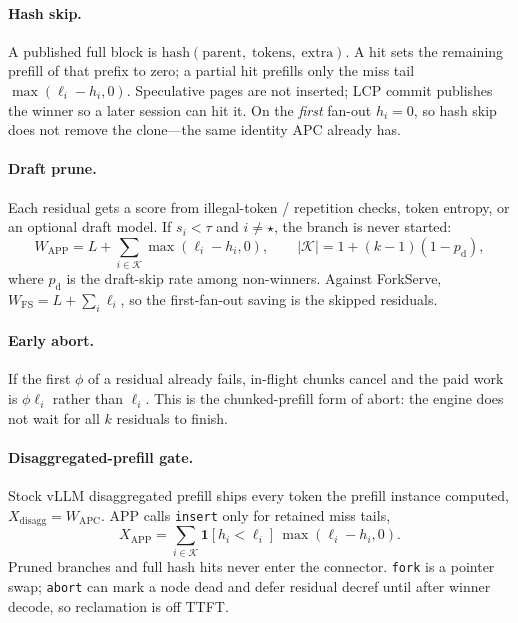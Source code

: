 \documentclass[11pt,a4paper]{article}
\begin{document}
\paragraph{Hash skip.}
A published full block is $\mathrm{hash}(\mathrm{parent},\;\mathrm{tokens},\;\mathrm{extra})$.
A hit sets the remaining prefill of that prefix to zero; a partial hit prefills only the miss tail $\max(\ell_i-h_i,0)$.
Speculative pages are not inserted; LCP commit publishes the winner so a later session can hit it.
On the \emph{first} fan-out $h_i{=}0$, so hash skip does not remove the clone---the same identity APC already has.

\paragraph{Draft prune.}
Each residual gets a score from illegal-token / repetition checks, token entropy, or an optional draft model.
If $s_i<\tau$ and $i\neq\star$, the branch is never started:
\begin{equation}
\label{eq:app-w}
W_{\mathrm{APP}}
  = L + \sum_{i\in\mathcal{K}}\max(\ell_i-h_i,0),
\qquad
|\mathcal{K}|
  = 1+(k{-}1)(1-p_{\mathrm{d}}),
\end{equation}
where $p_{\mathrm{d}}$ is the draft-skip rate among non-winners.
Against ForkServe, $W_{\mathrm{FS}}=L+\sum_i\ell_i$, so the first-fan-out saving is the skipped residuals.

\paragraph{Early abort.}
If the first $\phi$ of a residual already fails, in-flight chunks cancel and the paid work is $\phi\ell_i$ rather than $\ell_i$.
This is the chunked-prefill form of abort: the engine does not wait for all $k$ residuals to finish.

\paragraph{Disaggregated-prefill gate.}
Stock vLLM disaggregated prefill ships every token the prefill instance computed,
$X_{\mathrm{disagg}}=W_{\mathrm{APC}}$.
APP calls \texttt{insert} only for retained miss tails,
\begin{equation}
\label{eq:app-x}
X_{\mathrm{APP}}
  = \sum_{i\in\mathcal{K}}\mathbf{1}[h_i<\ell_i]\,\max(\ell_i-h_i,0).
\end{equation}
Pruned branches and full hash hits never enter the connector.
\texttt{fork} is a pointer swap; \texttt{abort} can mark a node dead and defer residual decref until after winner decode, so reclamation is off TTFT.
\end{document}
